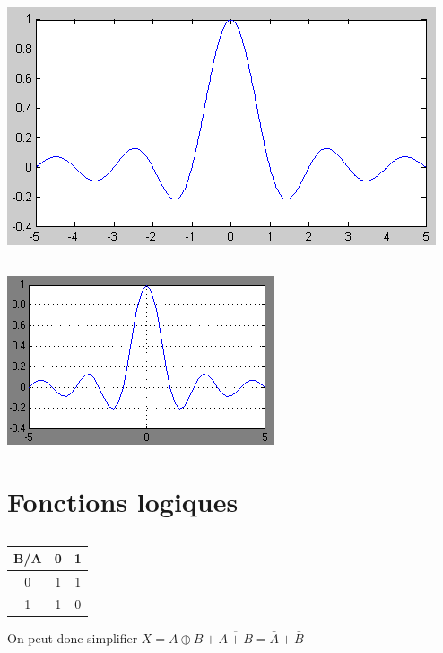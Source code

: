\documentclass[10pt]{article}
\begin{document}
  \subsection{}
   \begin{center}
    \includegraphics{5a}
   \end{center}
  \subsection{}
   \begin{center}
    \includegraphics{5b}
   \end{center}

 \section{Fonctions logiques}
  \subsection{}
   \begin{tabular}{|c|c|c|}
    \hline
    B/A&0&1\\
    \hline
    0&1&1\\
    \hline
    1&1&0\\
    \hline
   \end{tabular}
   On peut donc simplifier $X=A\oplus B+\overline{A+B}=\bar A + \bar B$
\end{document}
